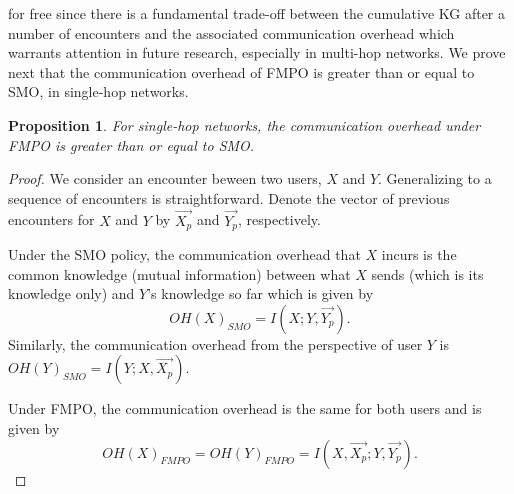 \documentclass[12pt,epsf]{article}
\newtheorem{prop}{Proposition}
\theoremstyle{definition}
\begin{document}
for free since there is a fundamental trade-off between the cumulative KG after a number of encounters and the associated communication overhead which warrants attention in future research, especially in multi-hop networks. We prove next that the communication overhead of FMPO is greater than or equal to SMO, in single-hop networks.
%
\vspace{-0.2 cm}
\begin{prop}
For single-hop networks, the communication overhead under FMPO is greater than or equal to SMO.
\end{prop}
%
\vspace{-0.5 cm}
\begin{proof}
We consider an encounter beween two users, $X$ and $Y$. Generalizing to a sequence of encounters is straightforward. Denote the vector of previous encounters for $X$ and $Y$ by $\vec{X_p}$ and $\vec{Y_p}$, respectively.

Under the SMO policy, the communication overhead that $X$ incurs is the common knowledge (mutual information) between what $X$ sends (which is its knowledge only) and $Y$'s 
knowledge so far which is given by 
\begin{equation}
OH(X)_{SMO}=I(X;Y,\vec{Y_p}).
\label{overheadX}
\end{equation}
Similarly, the communication overhead from the perspective of user $Y$ is $OH(Y)_{SMO}=I(Y;X,\vec{X_p})$.

Under FMPO, the communication overhead is the same for both users and is given by
\begin{equation} 
OH(X)_{FMPO}=OH(Y)_{FMPO}=I(X,\vec{X_p};Y, \vec{Y_p}).
\label{overheadXY}
\end{equation}


\end{proof}
\end{document}
